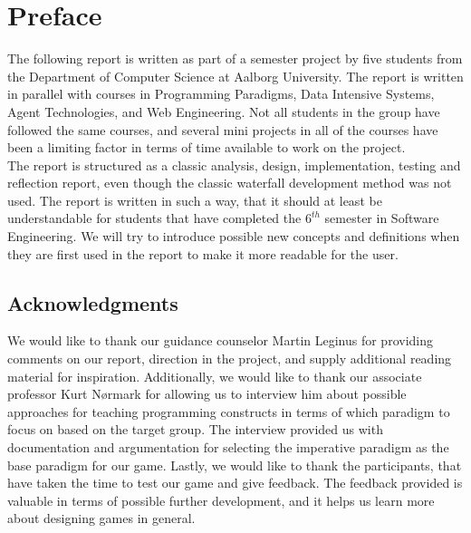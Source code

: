 \chapter*{Preface}

The following report is written as part of a semester project by five students from the Department of Computer Science at Aalborg University.
The report is written in parallel with courses in Programming Paradigms, Data Intensive Systems, Agent Technologies, and Web Engineering.
Not all students in the group have followed the same courses, and several mini projects in all of the courses have been a limiting factor in terms of time available to work on the project.\\

The report is structured as a classic analysis, design, implementation, testing and reflection report, even though the classic waterfall development method was not used.
The report is written in such a way, that it should at least be understandable for students that have completed the $6^{th}$ semester in Software Engineering.
We will try to introduce possible new concepts and definitions when they are first used in the report to make it more readable for the user.

\section*{Acknowledgments}

We would like to thank our guidance counselor Martin Leginus for providing comments on our report, direction in the project, and supply additional reading material for inspiration.
Additionally, we would like to thank our associate professor Kurt N{\o}rmark for allowing us to interview him about possible approaches for teaching programming constructs in terms of which paradigm to focus on based on the target group.
The interview provided us with documentation and argumentation for selecting the imperative paradigm as the base paradigm for our game.
Lastly, we would like to thank the participants, that have taken the time to test our game and give feedback.
The feedback provided is valuable in terms of possible further development, and it helps us learn more about designing games in general.
